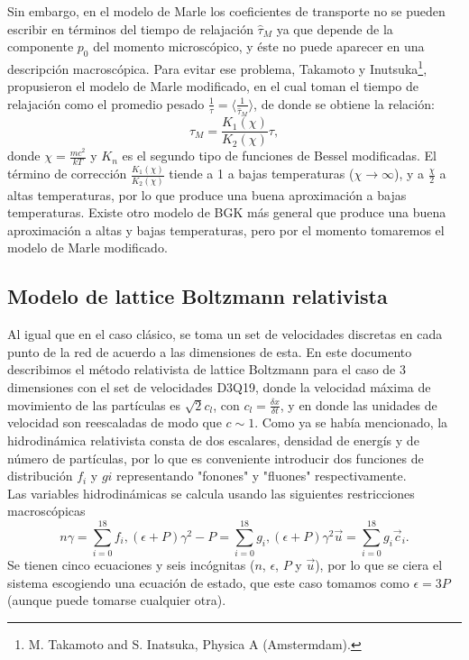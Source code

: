 \documentclass{article}
\begin{document}
Sin embargo, en el modelo de Marle los coeficientes de transporte no se pueden escribir en términos del tiempo de relajación $\hat{\tau}_M$ ya que depende de la componente $p_0$ del momento microscópico, y éste no puede aparecer en una descripción macroscópica. Para evitar ese problema, Takamoto y Inutsuka\footnote{M. Takamoto and S. Inatsuka, Physica A (Amstermdam).}, propusieron el modelo de Marle modificado, en el cual toman el tiempo de relajación como el promedio pesado $\frac{1}{\tau}= \langle \frac{1}{\hat{\tau}_M}\rangle$, de donde se obtiene la relación:
\begin{equation}
    \tau_M = \frac{K_1(\chi)}{K_2(\chi)}\tau,
\end{equation}
donde $\chi= \frac{mc^2}{kT}$ y $K_n$ es el segundo tipo de funciones de Bessel modificadas. El término de corrección $\frac{K_1(\chi)}{K_2(\chi)}$ tiende a 1 a bajas temperaturas ($\chi\rightarrow \infty$), y a $\frac{\chi}{2}$ a altas temperaturas, por lo que produce una buena aproximación a bajas temperaturas. Existe otro modelo de BGK más general que produce una buena aproximación a altas y bajas temperaturas, pero por el momento tomaremos el modelo de Marle modificado.

\subsection{Modelo de lattice Boltzmann relativista}
Al igual que en el caso clásico, se toma un set de velocidades discretas en cada punto de la red de acuerdo a las dimensiones de esta. En este documento describimos el método relativista de lattice Boltzmann para el caso de 3 dimensiones con el set de velocidades D3Q19, donde la velocidad máxima de movimiento de las partículas es $\sqrt{2}c_l$, con $c_l = \frac{\delta x}{\delta t}$, y en donde las unidades de velocidad son reescaladas de modo que $c\sim 1$. Como ya se había mencionado, la hidrodinámica relativista consta de dos escalares, densidad de energís y de número de partículas, por lo que es conveniente introducir dos funciones de distribución $f_i$ y $gi$ representando "fonones" y "fluones" respectivamente.\\

Las variables hidrodinámicas se calcula usando las siguientes restricciones macroscópicas
\begin{subequations}
\begin{equation}
    n\gamma = \sum_{i=0}^{18} f_i, 
\end{equation}
\begin{equation}
    (\epsilon+P) \gamma^2-P = \sum_{i=0}^{18} g_i, 
\end{equation}
\begin{equation}
    (\epsilon+P) \gamma^2 \vec{u} = \sum_{i=0}^{18} g_i \vec{c}_i. 
\end{equation}
\end{subequations}
Se tienen cinco ecuaciones y seis incógnitas ($n$, $\epsilon$, $P$ y $\vec{u}$), por lo que se ciera el sistema escogiendo una ecuación de estado, que este caso tomamos como $\epsilon= 3P$ (aunque puede tomarse cualquier otra).\\
\end{document}
